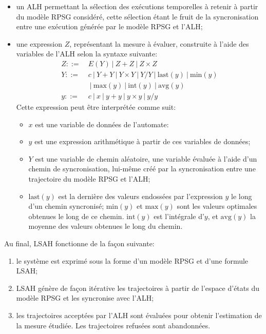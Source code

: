 \begin{itemize}
    \item un ALH permettant la sélection des exécutions temporelles à retenir à partir du modèle RPSG considéré, cette sélection étant le fruit de la syncronisation entre une exécution générée par le modèle RPSG et l'ALH;
    \item une expression $Z$, représentant la mesure à évaluer, construite à l'aide des variables de l'ALH selon la syntaxe suivante:
    \[
        \begin{split}
            Z ::= & \ E(Y)\ |\ Z+Z\ |\ Z \times Z\\
            Y ::= & \ c\ |\ Y+Y\ |\ Y \times Y\ |\ Y/Y\ |\ \mbox{last}(y)\ |\ \mbox{min}(y)\\
                  & \ \  |\ \mbox{max}(y)\ |\ \mbox{int}(y)\ |\ \mbox{avg}(y)\\
            y ::= & \ c\ |\ x\ |\ y+y\ |\ y \times y\ |\ y/y
        \end{split}
    \]
    Cette expression peut être interprétée comme suit:
    \begin{itemize}
        \item $x$ est une variable de données de l'automate:
        \item $y$ est une expression arithmétique à partir de ces variables de données;
        \item $Y$ est une variable de chemin aléatoire, \cad une variable évaluée à l'aide d'un chemin de syncronisation, lui-même créé par la syncronisation entre une trajectoire du modèle RPSG et l'ALH;
        \item $\mbox{last}(y)$ est la dernière des valeurs endossées par l'expression $y$ le long d'un chemin syncronisé; $\mbox{min}(y)$ et $\mbox{max}(y)$ sont les valeurs optimales obtenues le long de ce chemin. $\mbox{int}(y)$ est l'intégrale d'$y$, et $\mbox{avg}(y)$ la moyenne des valeurs obtenues le long du chemin.
    \end{itemize}
\end{itemize}

Au final, LSAH fonctionne de la façon suivante:
\begin{enumerate}
    \item le système est exprimé sous la forme d'un modèle RPSG et d'une formule LSAH;
    \item LSAH génère de façon itérative les trajectoires à partir de l'espace d'états du modèle RPSG et les syncronise avec l'ALH;
    \item les trajectoires acceptées par l'ALH sont évaluées pour obtenir l'estimation de la mesure étudiée. Les trajectoires refusées sont abandonnées.
\end{enumerate}

